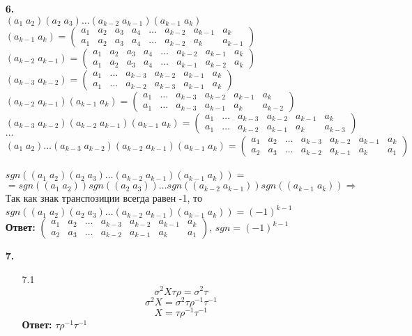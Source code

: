 \documentclass[a4paper]{article}
\newcommand{\mat}[1]{\begin{pmatrix} #1 \end{pmatrix}}
\renewcommand{\r}{\Rightarrow}
\begin{document}
\begin{enumerate}
      \item[\textbf{6.}]\indent \\
            $(a_1 \; a_2)(a_2 \; a_3)\dots(a_{k-2} \; a_{k-1})(a_{k-1} \; a_{k})$\\
            $(a_{k-1} \; a_{k}) = \mat{a_1 & a_2 & a_3 & a_4 & \dots & a_{k-2} & a_{k-1} & a_{k} \\ a_1 & a_2 & a_3 & a_4 & \dots & a_{k-2} & a_{k} & a_{k-1}}$\\
            $(a_{k-2} \; a_{k-1}) = \mat{a_1 & a_2 & a_3 & a_4 & \dots & a_{k-2} & a_{k-1} & a_{k} \\ a_1 & a_2 & a_3 & a_4 & \dots & a_{k-1} & a_{k-2} & a_{k}}$\\
            $(a_{k-3} \; a_{k-2}) = \mat{a_1 & \dots & a_{k-3} & a_{k-2} & a_{k-1} & a_{k} \\ a_1 & \dots &  a_{k-2} & a_{k-3} & a_{k-1} & a_{k}}$\\
            $(a_{k-2} \; a_{k-1})(a_{k-1} \; a_{k}) = \mat{a_1 & \dots & a_{k-3} & a_{k-2} & a_{k-1} & a_{k} \\ a_1 & \dots & a_{k-3}  & a_{k-1} & a_{k} & a_{k-2}}$\\
            $(a_{k-3} \; a_{k-2})(a_{k-2} \; a_{k-1})(a_{k-1} \; a_{k}) = \mat{a_1 & \dots & a_{k-3} & a_{k-2} & a_{k-1} & a_{k} \\ a_1 & \dots & a_{k-2}  & a_{k-1} & a_{k} & a_{k-3}}$\\
            $\dots$\\
            $(a_1 \; a_2)\dots (a_{k-3} \; a_{k-2})(a_{k-2} \; a_{k-1})(a_{k-1} \; a_{k}) = \mat{a_1 & a_2 & \dots & a_{k-3} & a_{k-2} & a_{k-1} & a_{k} \\ a_2 & a_3 & \dots & a_{k-2}  & a_{k-1} & a_{k} & a_{1}}$\\\\
            $sgn((a_1 \; a_2)(a_2 \; a_3)\dots(a_{k-2} \; a_{k-1})(a_{k-1} \; a_{k})) = $\\
            $= sgn((a_1 \; a_2))sgn((a_2 \; a_3))\dots sgn((a_{k-2} \; a_{k-1}))sgn((a_{k-1} \; a_{k}))\r $ Так как знак транспозиции всегда равен -1, то \\
            $sgn((a_1 \; a_2)(a_2 \; a_3)\dots(a_{k-2} \; a_{k-1})(a_{k-1} \; a_{k})) = (-1)^{k-1}$\\
            \textbf{Ответ: } $\mat{a_1 & a_2 & \dots & a_{k-3} & a_{k-2} & a_{k-1} & a_{k} \\ a_2 & a_3 & \dots & a_{k-2}  & a_{k-1} & a_{k} & a_{1}}$, $sgn = (-1)^{k-1}$

      \item[\textbf{7.}] \indent \\
            \begin{enumerate}
                  \item[7.1]$$\sigma^2X\tau\rho= \sigma^2\tau$$
                        $$\sigma^2X= \sigma^2\tau \rho^{-1} \tau^{-1}$$
                        $$X= \tau \rho^{-1} \tau^{-1}$$
                        \textbf{Ответ: } $\tau \rho^{-1} \tau^{-1}$


\end{enumerate}
\end{enumerate}
\end{document}
